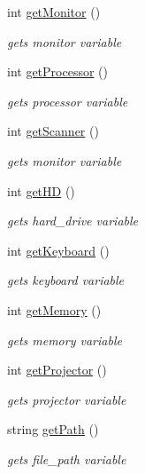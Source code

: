 \begin{DoxyCompactItemize}
int \mbox{\hyperlink{classconfig_a8d6bac5f06d23f3cda348d8908384128}{get\+Monitor}} ()
\begin{DoxyCompactList}\small\item\em gets monitor variable \end{DoxyCompactList}\item 
int \mbox{\hyperlink{classconfig_a77cfd91eb08979cd773bc4b42e2f5c1c}{get\+Processor}} ()
\begin{DoxyCompactList}\small\item\em gets processor variable \end{DoxyCompactList}\item 
int \mbox{\hyperlink{classconfig_a6ee8004748fd4a64a611a3001509e878}{get\+Scanner}} ()
\begin{DoxyCompactList}\small\item\em gets monitor variable \end{DoxyCompactList}\item 
int \mbox{\hyperlink{classconfig_adeeb1fbdbaf55ecd2a912fd1446d0021}{get\+HD}} ()
\begin{DoxyCompactList}\small\item\em gets hard\+\_\+drive variable \end{DoxyCompactList}\item 
int \mbox{\hyperlink{classconfig_ae641db7341e7483714a27862e606e96d}{get\+Keyboard}} ()
\begin{DoxyCompactList}\small\item\em gets keyboard variable \end{DoxyCompactList}\item 
int \mbox{\hyperlink{classconfig_a8f679a43d549ab2e0bc66536ba62e6f8}{get\+Memory}} ()
\begin{DoxyCompactList}\small\item\em gets memory variable \end{DoxyCompactList}\item 
int \mbox{\hyperlink{classconfig_aae8fea6c3b76d240bbd9eadaa16fc11c}{get\+Projector}} ()
\begin{DoxyCompactList}\small\item\em gets projector variable \end{DoxyCompactList}\item 
string \mbox{\hyperlink{classconfig_a9c5684cef814969ee251614da14c5e9a}{get\+Path}} ()
\begin{DoxyCompactList}\small\item\em gets file\+\_\+path variable \end{DoxyCompactList}\item 

\end{DoxyCompactItemize}
